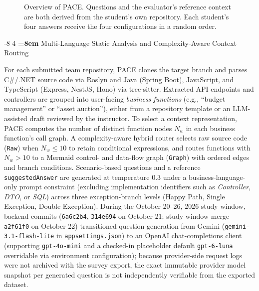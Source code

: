 \documentclass{llncs}
\makeatletter
\renewcommand\subsection{\@startsection{subsection}{2}{\z@}%
                       {-8\p@ \@plus -2\p@ \@minus -2\p@}%
                       {4\p@ \@plus 1\p@ \@minus 1\p@}%
                       {\normalfont\normalsize\bfseries\boldmath
                        \rightskip=\z@ \@plus 8em\pretolerance=10000 }}
\makeatother
\begin{document}
\begin{figure}[!ht]
\caption{Overview of PACE. Questions and the evaluator's reference context are both derived from the student's own repository. Each student's four answers receive the four configurations in a random order.}
\label{fig:overview}
\vspace{-3mm}
\end{figure}

\subsection{Multi-Language Static Analysis and Complexity-Aware Context Routing}

For each submitted team repository, PACE clones the target branch and parses C\#/.NET source code via Roslyn and Java (Spring Boot), JavaScript, and TypeScript (Express, NestJS, Hono) via tree-sitter. Extracted API endpoints and controllers are grouped into user-facing \emph{business functions} (e.g., ``budget management'' or ``asset auction''), either from a repository template or an LLM-assisted draft reviewed by the instructor. To select a context representation, PACE computes the number of distinct function nodes $N_w$ in each business function's call graph. A complexity-aware hybrid router selects raw source code (\texttt{Raw}) when $N_w \le 10$ to retain conditional expressions, and routes functions with $N_w > 10$ to a Mermaid control- and data-flow graph (\texttt{Graph}) with ordered edges and branch conditions. Scenario-based questions and a reference \texttt{suggestedAnswer} are generated at temperature $0.3$ under a business-language-only prompt constraint (excluding implementation identifiers such as \emph{Controller}, \emph{DTO}, or \emph{SQL}) across three exception-branch levels (Happy Path, Single Exception, Double Exception). During the October 20--26, 2026 study window, backend commits (\texttt{6a6c2b4}, \texttt{314e694} on October 21; study-window merge \texttt{a2f61f0} on October 22) transitioned question generation from Gemini (\texttt{gemini-3.1-flash-lite} in \texttt{appsettings.json}) to an OpenAI chat-completions client (supporting \texttt{gpt-4o-mini} and a checked-in placeholder default \texttt{gpt-6-luna} overridable via environment configuration); because provider-side request logs were not archived with the survey export, the exact immutable provider model snapshot per generated question is not independently verifiable from the exported dataset.
\end{document}

